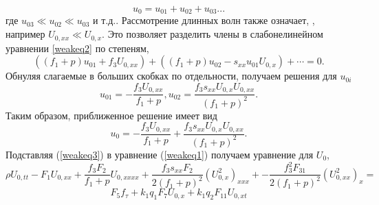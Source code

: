 \[
u_0=u_{01}+u_{02}+u_{03}...
\]
где $u_{03} \ll u_{02} \ll u_{03}$ и т.д.. Рассмотрение длинных волн также означает, , например $ U_{0, xx} \ll U_{0, x} $. Это позволяет разделить члены в слабонелинейном уравнении \ref{weakeq2} по степеням,
\[
\left((f_1+p) u_{01} + f_3 U_{0,xx}\right) + \left((f_1+p) u_{02} - s_{xx} u_{01} U_{0,x}\right) + \cdots = 0.
\]
Обнуляя слагаемые в больших скобках по отдельности, получаем решения для $u_{0i}$
\[
u_{01} = -\frac{f_3 U_{0, xx}}{f_1+p}, u_{02}= \frac{f_3 s_{xx} U_{0,x}U_{0,xx}}{(f_1+p)^2}.
\]
Таким образом, приближенное решение имеет вид
\begin{equation}
	u_0=-\frac{f_3 U_{0,xx}}{f_1+p}+\frac{f_3 s_{xx} U_{0,x} U_{0,xx}}{(f_1+p)^2}\label{weakeq3}.
\end{equation}
Подставляя (\ref{weakeq3}) в уравнение (\ref{weakeq1}) получаем уравнение для $U_0$,
\[
\rho U_{0,tt}- F_1 U_{0,xx}+ \frac{f_3 F_2}{f_1+p}U_{0,xxxx}+\frac{f_3 s_{xx} F_{2}}{2(f_1+p)^2} (U_{0,x}^2)_{xxx}+
-\frac{f_3^2 F_{31}}{2(f_1+p)^2} (U_{0,xx}^2)_{x}=
\]
\begin{equation}
	F_5 f_\tau+k_1 q_1 F_7 U_{0,x} + k_1 q_2 F_{11}U _{0,xt}\label{weakeq4}
\end{equation}

